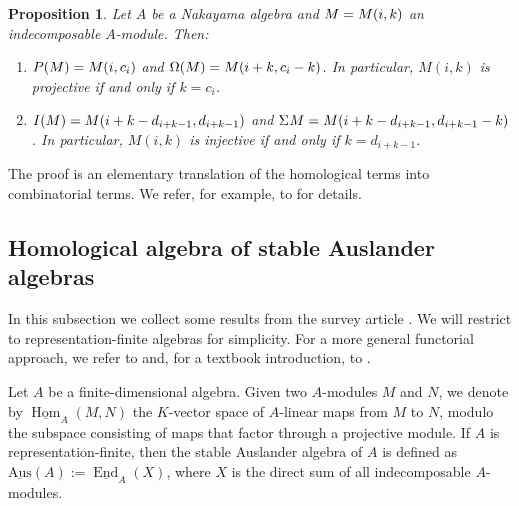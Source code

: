 \documentclass[a4paper]{amsart}
\newtheorem{proposition}[theorem]{Proposition}
\theoremstyle{definition}
\theoremstyle{remark}
\numberwithin{equation}{theorem}
\newcommand{\End}{\operatorname{End}}
\newcommand{\Hom}{\operatorname{Hom}}
\newcommand{\sAus}{\operatorname{\underline{Aus}}}
\newcommand{\K}{K}
\begin{document}
\begin{proposition}\label{prop:injenvcosyz}
Let $A$ be a Nakayama algebra and  $M = \mik$ an indecomposable $A$-module. Then:
\begin{enumerate}
    \item $P(M) = \mik[i][c_i] $ and $\Omega(M) = \mik[i + k][c_i - k]$.  In particular, $M(i,k)$ is projective if and only if $k=c_i$.
    \item $ I(M) = \mik[i + k - d_{i + k - 1}][d_{i + k - 1}] $ and $\cosyz M = \mik[i + k - d_{i + k - 1}][d_{i + k - 1} - k]$. In particular, $M(i,k)$ is injective if and only if $k=d_{i + k - 1}$.
\end{enumerate}
\end{proposition}
The proof is an elementary translation of the homological terms into combinatorial terms. We refer, for example, to \cite{MRS} for details.

\subsection{Homological algebra of stable Auslander algebras}
In this subsection we collect some results from the survey article \cite{AR}. We will restrict to representation-finite algebras for simplicity. For a more general functorial approach, we refer to \cite{AR,AR1} and, for a textbook introduction, to \cite[Section~5.11]{Zi}.

Let $A$ be a finite-dimensional algebra.
Given two $A$-modules $M$ and $N$, we denote by $\underline{\Hom}_A(M,N)$ the $\K$-vector space of $A$-linear maps from $M$ to $N$, modulo the subspace consisting of maps that factor through a projective module. If $ A $ is representation-finite, then the stable Auslander algebra of $A$ is defined as $\sAus(A):=\underline{\End}_A(X)$, where $X$ is the direct sum of all indecomposable $A$-modules.
\end{document}
